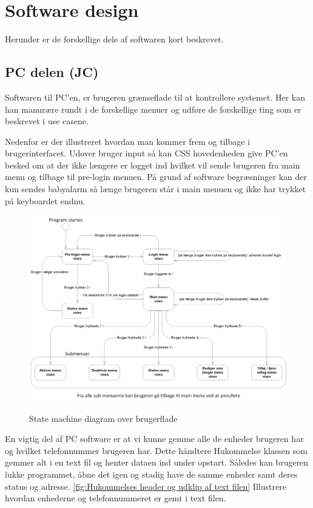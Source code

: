\clearpage

\section{Software design}

Herunder er de forskellige dele af softwaren kort beskrevet. 

\subsection{PC delen (JC)}

Softwaren til PC'en, er brugeren grænseflade til at kontrollere systemet. Her kan han manurære rundt i de forskellige menuer og udføre de forskellige ting som er beskrevet i use casene.

Nedenfor er der illustreret hvordan man kommer frem og tilbage i brugerinterfacet. Udover bruger input så kan CSS hovedenheden give PC'en besked om at der ikke længere er logget ind hvilket vil sende brugeren fra main menu og tilbage til pre-login menuen. På grund af software begræsninger kan der kun sendes babyalarm så længe brugeren står i main menuen og ikke har trykket på keyboardet endnu.

\begin{figure}[htbp] \centering
{\includegraphics[width=\textwidth]{billeder/uml/state_machine_main}}
\caption{State machine diagram over brugerflade}
\label{fig:State machine diagram over brugerflade}
\end{figure}

En vigtig del af PC software er at vi kunne gemme alle de enheder brugeren har og hvilket telefonnummer brugeren har. Dette håndtere Hukommelse klassen som gemmer alt i en text fil og henter dataen ind under opstart. Således kan brugeren lukke programmet, åbne det igen og stadig have de samme enheder samt deres status og adresse. \ref{fig:Hukommelses header og udklip af text filen} Illustrere hvordan enhederne og telefonnummeret er gemt i text filen.

